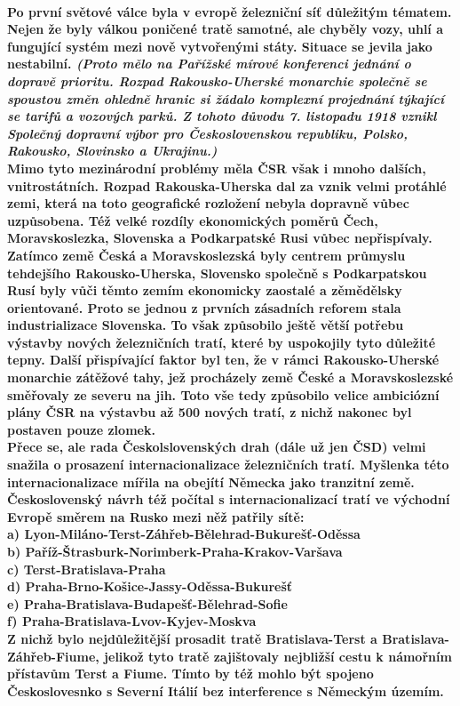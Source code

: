 \documentclass{article}
\begin{document}
\paragraph{\quad Po první světové válce byla v evropě železniční síť důležitým tématem. Nejen že byly válkou poničené tratě samotné, ale chyběly vozy, uhlí a fungující systém mezi nově vytvořenými státy. Situace se jevila jako nestabilní.
\textit{(Proto mělo na Pařížské mírové konferenci jednání o dopravě prioritu. Rozpad Rakousko-Uherské monarchie společně se spoustou změn ohledně hranic si žádalo komplexní projednání týkající se tarifů a vozových parků. Z tohoto důvodu 7. listopadu 1918 vznikl Společný dopravní výbor pro Československou republiku, Polsko, Rakousko, Slovinsko a Ukrajinu.) }
\\\indent  Mimo tyto mezinárodní problémy měla ČSR však i mnoho dalších, vnitrostátních. Rozpad Rakouska-Uherska dal za vznik velmi protáhlé zemi, která na toto geografické rozložení nebyla dopravně vůbec uzpůsobena. Též velké rozdíly ekonomických poměrů Čech, Moravskoslezka, Slovenska a Podkarpatské Rusi vůbec nepřispívaly. Zatímco země Česká a Moravskoslezská byly centrem průmyslu tehdejšího Rakousko-Uherska, Slovensko společně s Podkarpatskou Rusí byly vůči těmto zemím ekonomicky zaostalé a zěmědělsky orientované. Proto se jednou z prvních zásadních reforem stala industrializace Slovenska. To však způsobilo ještě větší potřebu výstavby nových železničních tratí, které by uspokojily tyto důležité tepny. Další přispívající faktor byl ten, že v rámci Rakousko-Uherské monarchie zátěžové tahy, jež procházely země České a Moravskoslezské směřovaly ze severu na jih. Toto vše tedy způsobilo velice ambiciózní plány ČSR na výstavbu až 500 nových tratí, z nichž nakonec byl postaven pouze zlomek.
\\\indent Přece se, ale rada Českolslovenských drah (dále už jen ČSD) velmi snažila o prosazení internacionalizace železničních tratí. Myšlenka této internacionalizace mířila na obejítí Německa jako tranzitní země. Československý návrh též počítal s internacionalizací tratí ve východní Evropě směrem na Rusko mezi něž patřily sítě:
\\\indent a) Lyon-Miláno-Terst-Záhřeb-Bělehrad-Bukurešť-Oděssa
\\\indent b) Paříž-Štrasburk-Norimberk-Praha-Krakov-Varšava
\\\indent c) Terst-Bratislava-Praha
\\\indent d) Praha-Brno-Košice-Jassy-Oděssa-Bukurešť
\\\indent e) Praha-Bratislava-Budapešť-Bělehrad-Sofie
\\\indent f) Praha-Bratislava-Lvov-Kyjev-Moskva
\\\indent Z nichž bylo nejdůležitější prosadit tratě Bratislava-Terst a Bratislava-Záhřeb-Fiume, jelikož tyto tratě zajištovaly nejbližší cestu k námořním přístavům Terst a Fiume. Tímto by též mohlo být spojeno Českoslovesnko s Severní Itálií bez interference s Německým územím. 
 }
\end{document}
